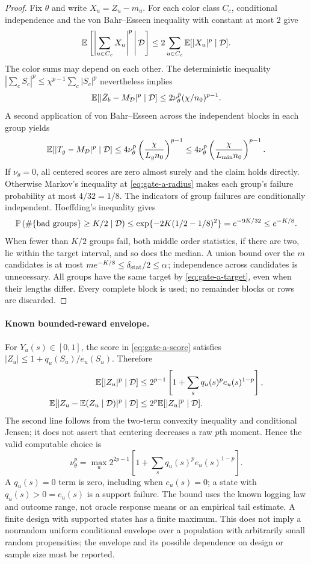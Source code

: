 \begin{proof}
Fix $\theta$ and write $X_u=Z_u-m_u$. For each color class $C_c$,
conditional independence and the von Bahr--Esseen inequality with
constant at most $2$ give
\[
 \mathbb{E}\left[\left|\sum_{u\in C_c}X_u\right|^p
       \,\middle|\,\mathcal D\right]
 \le2\sum_{u\in C_c}\mathbb{E}[|X_u|^p\mid\mathcal D].
\]
The color sums may depend on each other. The deterministic inequality
$|\sum_c S_c|^p\le\chi^{p-1}\sum_c|S_c|^p$ nevertheless implies
\[
 \mathbb{E}[|\bar Z_b-M_{\mathcal D}|^p\mid\mathcal D]
 \le2\nu_\theta^p(\chi/n_0)^{p-1}.
\]
A second application of von Bahr--Esseen across the independent blocks
in each group yields
\[
 \mathbb{E}[|T_g-M_{\mathcal D}|^p\mid\mathcal D]
 \le4\nu_\theta^p
       \left(\frac{\chi}{L_g n_0}\right)^{p-1}
 \le4\nu_\theta^p
       \left(\frac{\chi}{L_{\min}n_0}\right)^{p-1}.
\]
If $\nu_\theta=0$, all centered scores are zero almost surely and the
claim holds directly. Otherwise Markov's inequality at
\cref{eq:gate-a-radius} makes each group's failure
probability at most $4/32=1/8$. The indicators of group failures are
conditionally independent. Hoeffding's inequality gives
\[
 \mathbb{P}\left(\#\{\text{bad groups}\}\ge K/2\mid\mathcal D\right)
 \le \exp\{-2K(1/2-1/8)^2\}
 =e^{-9K/32}\le e^{-K/8}.
\]
When fewer than $K/2$ groups fail, both middle order statistics, if there
are two, lie within the target interval, and so does the median.
A union bound over the $m$ candidates is at most
$m e^{-K/8}\le\delta_{\rm stat}/2\le\alpha$; independence across
candidates is unnecessary. All groups have the same target by
\cref{eq:gate-a-target}, even when their lengths differ. Every complete
block is used; no remainder blocks or rows are discarded.
\end{proof}

\paragraph{Known bounded-reward envelope.}
For $Y_u(s)\in[0,1]$, the score in \cref{eq:gate-a-score} satisfies
$|Z_u|\le1+q_u(S_u)/e_u(S_u)$. Therefore
\begin{align}
 \mathbb{E}[|Z_u|^p\mid\mathcal D]
 &\le2^{p-1}\left[1+\sum_s q_u(s)^p e_u(s)^{1-p}\right],\\
 \mathbb{E}[|Z_u-\mathbb{E}(Z_u\mid\mathcal D)|^p\mid\mathcal D]
 &\le2^p\mathbb{E}[|Z_u|^p\mid\mathcal D].
\end{align}
The second line follows from the two-term convexity inequality and
conditional Jensen; it does not assert that centering decreases a raw
$p$th moment. Hence the valid computable choice is
\begin{equation}
 \nu_\theta^p
 =\max_u 2^{2p-1}
       \left[1+\sum_s q_u(s)^p e_u(s)^{1-p}\right].
\label{eq:gate-a-envelope}
\end{equation}
A $q_u(s)=0$ term is zero, including when $e_u(s)=0$; a state with
$q_u(s)>0=e_u(s)$ is a support failure. The bound uses the known logging
law and outcome range, not oracle response means or an empirical tail
estimate. A finite design with supported states has a finite maximum.
This does not imply a nonrandom uniform conditional envelope over a
population with arbitrarily small random propensities; the envelope and
its possible dependence on design or sample size must be reported.

